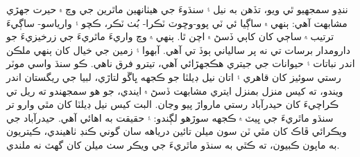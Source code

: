 \documentclass[a4paper]{article}
\begin{document}
\begin{flushright}
ننڍو سمجهيو ٿي ويو، تڏهن به نيل ۽ سنڌوءَ جي هيٺانهين ماٿرين جي وچ ۾ حيرت جهڙي مشابهت آهي: ٻنهي ۾ ساڳيا ئي ٽي پوو-وڇوٽ ٽڪرا- بُٺ ٽڪر، ڪچو ۽ وارياسو- ساڳيءَ ترتيب ۾ ساڄي کان کاٻي ڏسڻ ۾ اچن ٿا. ٻنهي ۾ وچ واريءَ ماٿريءَ جي زرخيزيءَ جو دارومدار برسات تي نه پر سالياني ٻوڏ تي آهي. آبهوا ۽ زمين جي خيال کان ٻنهي ملڪن اندر نباتات ۽ حيوانات جي جيتري هڪجهڙائي آهي، تيترو فرق ناهي. ڪو سنڌ واسي موٽر رستي سوئيز کان قاهري ۽ اتان نيل ڊيلٽا جو ڪجهه ڀاڱو لتاڙي، لبيا جي ريگستان اندر ويندو، ته کيس منزل بمنزل ايتري مشابهت ڏسڻ ۾ ايندي، جو هو سمجهندو ته ريل تي ڪراچيءَ کان حيدرآباد رستي مارواڙ پيو وڃان. البت کيس نيل ڊيلٽا کان مٿي وارو تر سنڌو ماٿريءَ جي ڀيٽ ۾ ڪجهه سوڙهو لڳندو: ۽ حقيقت به اهائي آهي. حيدرآباد جي ويڪرائي ڦاڪ کان مٿي ٽن سون ميلن تائين درياهه سان گوني ڪنڊ ٺاهيندي، ڪيتريون به ماپون ڪبيون، ته ڪٿي به سنڌو ماٿريءَ جي ويڪر سٺ ميلن کان گهٽ نه ملندي.


\end{flushright}
\end{document}
